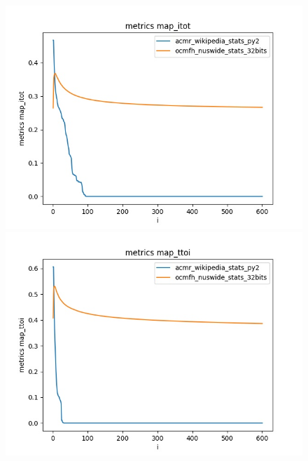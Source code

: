 \begin{figure}[H]
\begin{minipage}[!h]{0.6\linewidth}
            \end{minipage}
            \begin{minipage}[!h]{0.6\linewidth}
                \centering
                \includegraphics[width=\linewidth]{resultsImages/map/metrics map_itot_both_both.jpeg}
            \end{minipage}
            \begin{minipage}[!h]{0.6\linewidth}
                \centering
                \includegraphics[width=\linewidth]{resultsImages/map/metrics map_ttoi_both_both.jpeg}

\end{minipage}
\end{figure}
